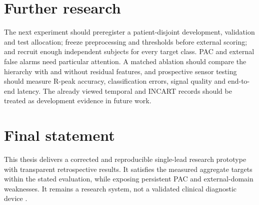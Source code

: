 \section{Further research}
The next experiment should preregister a patient-disjoint development,
validation and test allocation; freeze preprocessing and thresholds before
external scoring; and recruit enough independent subjects for every target
class. PAC and external false alarms need particular attention. A matched
ablation should compare the hierarchy with and without residual features,
and prospective sensor testing should measure R-peak accuracy, classification
errors, signal quality and end-to-end latency. The already viewed temporal
and INCART records should be treated as development evidence in future work.

\section{Final statement}
This thesis delivers a corrected and reproducible single-lead research
prototype with transparent retrospective results. It satisfies the measured
aggregate targets within the stated evaluation, while exposing persistent
PAC and external-domain weaknesses. It remains a research system, not a
validated clinical diagnostic device \cite{collins2024tripodai}.
